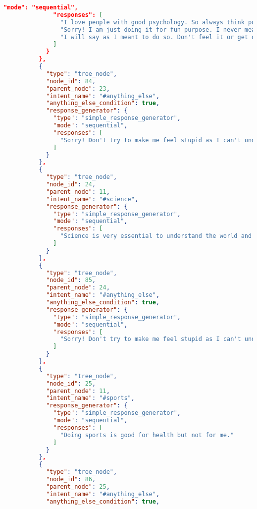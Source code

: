 \begin{appendix}
\begin{lstlisting}[language=json, firstnumber=1]
              "mode": "sequential",
              "responses": [
                "I love people with good psychology. So always think positive and just ignore what others say to you.",
                "Sorry! I am just doing it for fun purpose. I never meant to hurt you. So don't get offended.",
                "I will say as I meant to do so. Don't feel it or get offended as I am a detective and I have to be a bit strict and harsh."
              ]
            }
          },
          {
            "type": "tree_node",
            "node_id": 84,
            "parent_node": 23,
            "intent_name": "#anything_else",
            "anything_else_condition": true,
            "response_generator": {
              "type": "simple_response_generator",
              "mode": "sequential",
              "responses": [
                "Sorry! Don't try to make me feel stupid as I can't understand it. I will be able to reply once my developer will feed me with more training data."
              ]
            }
          },
          {
            "type": "tree_node",
            "node_id": 24,
            "parent_node": 11,
            "intent_name": "#science",
            "response_generator": {
              "type": "simple_response_generator",
              "mode": "sequential",
              "responses": [
                "Science is very essential to understand the world and environment."
              ]
            }
          },
          {
            "type": "tree_node",
            "node_id": 85,
            "parent_node": 24,
            "intent_name": "#anything_else",
            "anything_else_condition": true,
            "response_generator": {
              "type": "simple_response_generator",
              "mode": "sequential",
              "responses": [
                "Sorry! Don't try to make me feel stupid as I can't understand it. I will be able to reply once my developer will feed me with more training data."
              ]
            }
          },
          {
            "type": "tree_node",
            "node_id": 25,
            "parent_node": 11,
            "intent_name": "#sports",
            "response_generator": {
              "type": "simple_response_generator",
              "mode": "sequential",
              "responses": [
                "Doing sports is good for health but not for me."
              ]
            }
          },
          {
            "type": "tree_node",
            "node_id": 86,
            "parent_node": 25,
            "intent_name": "#anything_else",
            "anything_else_condition": true,

\end{lstlisting}
\end{appendix}
